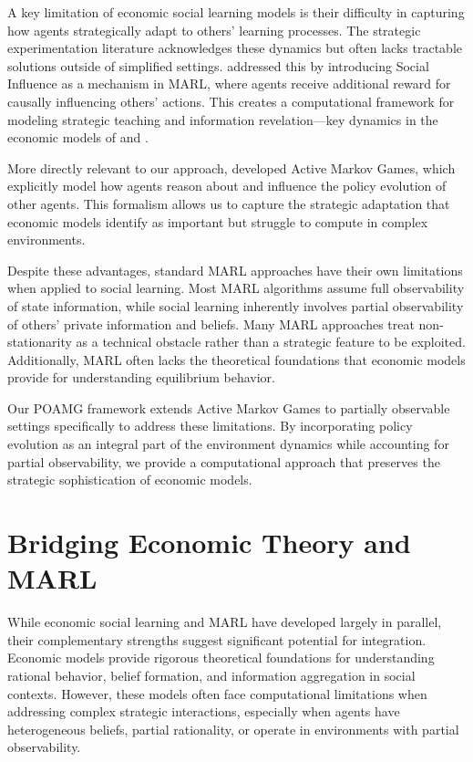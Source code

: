 \documentclass[a4paper,12pt]{report}
\begin{document}
A key limitation of economic social learning models is their difficulty in capturing how agents strategically adapt to others' learning processes. The strategic experimentation literature acknowledges these dynamics but often lacks tractable solutions outside of simplified settings. \citet{jaques2019social} addressed this by introducing Social Influence as a mechanism in MARL, where agents receive additional reward for causally influencing others' actions. This creates a computational framework for modeling strategic teaching and information revelation—key dynamics in the economic models of \citet{bolton1999strategic} and \citet{heidhues2015strategic}.

More directly relevant to our approach, \citet{kim2022influencing} developed Active Markov Games, which explicitly model how agents reason about and influence the policy evolution of other agents. This formalism allows us to capture the strategic adaptation that economic models identify as important but struggle to compute in complex environments.

Despite these advantages, standard MARL approaches have their own limitations when applied to social learning. Most MARL algorithms assume full observability of state information, while social learning inherently involves partial observability of others' private information and beliefs. Many MARL approaches treat non-stationarity as a technical obstacle rather than a strategic feature to be exploited. Additionally, MARL often lacks the theoretical foundations that economic models provide for understanding equilibrium behavior.

Our POAMG framework extends Active Markov Games to partially observable settings specifically to address these limitations. By incorporating policy evolution as an integral part of the environment dynamics while accounting for partial observability, we provide a computational approach that preserves the strategic sophistication of economic models.

\section{Bridging Economic Theory and MARL}

While economic social learning and MARL have developed largely in parallel, their complementary strengths suggest significant potential for integration. Economic models provide rigorous theoretical foundations for understanding rational behavior, belief formation, and information aggregation in social contexts. However, these models often face computational limitations when addressing complex strategic interactions, especially when agents have heterogeneous beliefs, partial rationality, or operate in environments with partial observability.
\end{document}
